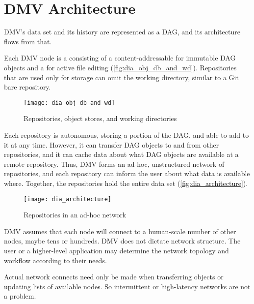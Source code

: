 \chapter{DMV Architecture}

DMV's data set and its history are represented as a DAG, and its architecture
flows from that.

Each DMV node is a  consisting of a content-addressable
 for immutable DAG objects and a  for active file editing (\autoref{fig:dia_obj_db_and_wd}).
Repositories that are used only for storage can omit the working directory,
similar to a Git bare repository.

\begin{figure}[h]
  \centering
    \texttt{[image: dia\_obj\_db\_and\_wd]}
  \caption{Repositories, object stores, and working directories}
  \label{fig:dia_obj_db_and_wd}
\end{figure}

Each repository is autonomous, storing a portion of the DAG, and able to add to
it at any time. However, it can transfer DAG objects to and from other
repositories, and it can cache data about what DAG objects are available at a
remote repository. Thus, DMV forms an ad-hoc, unstructured network of
repositories, and each repository can inform the user about what data is
available where. Together, the repositories hold the entire data set
(\autoref{fig:dia_architecture}).

\begin{figure}[h]
  \centering
    \texttt{[image: dia\_architecture]}
  \caption{Repositories in an ad-hoc network}
  \label{fig:dia_architecture}
\end{figure}

DMV assumes that each node will connect to a human-scale number of other nodes,
maybe tens or hundreds. DMV does not dictate network structure. The user or a
higher-level application may determine the network topology and workflow
according to their needs.

Actual network connects need only be made when transferring objects or updating
lists of available nodes. So intermittent or high-latency networks are not a
problem.
